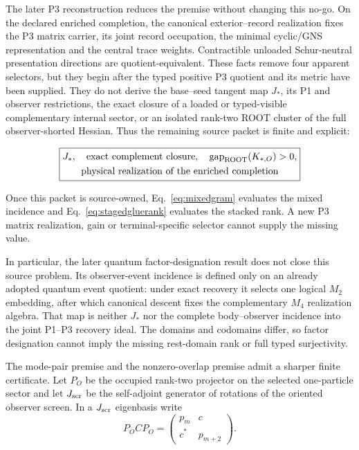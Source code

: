 \documentclass[11pt]{article}
\begin{document}
The later P3 reconstruction reduces the premise without changing this no-go.
On the declared enriched completion, the canonical exterior--record
realization fixes the P3 matrix carrier, its joint record occupation, the
minimal cyclic/GNS representation and the central trace weights. Contractible
unloaded Schur-neutral presentation directions are quotient-equivalent. These
facts remove four apparent selectors, but they begin after the typed positive
P3 quotient and its metric have been supplied. They do not derive the
base--seed tangent map $J_*$, its P1 and observer restrictions, the exact
closure of a loaded or typed-visible complementary internal sector, or an
isolated rank-two ROOT cluster of the full observer-shorted Hessian. Thus the
remaining source packet is finite and explicit:

\begin{equation}
\boxed{
\begin{gathered}
J_*,\quad \text{exact complement closure},\quad
\operatorname{gap}_{\rm ROOT}(K_{*,O})>0,\\
\text{physical realization of the enriched completion}
\end{gathered}}
\label{eq:p3premisereduction}
\end{equation}

Once this packet is source-owned, Eq.~\eqref{eq:mixedgram} evaluates the mixed
incidence and Eq.~\eqref{eq:stagedgluerank} evaluates the stacked rank. A new
P3 matrix realization, gain or terminal-specific selector cannot supply the
missing value.

In particular, the later quantum factor-designation result does not close
this source problem.  Its observer-event incidence is defined only on an
already adopted quantum event quotient: under exact recovery it selects one
logical $M_2$ embedding, after which canonical descent fixes the complementary
$M_4$ realization algebra.  That map is neither $J_*$ nor the complete
body--observer incidence into the joint P1--P3 recovery ideal.  The domains
and codomains differ, so factor designation cannot imply the missing
rest-domain rank or full typed surjectivity.

The mode-pair premise and the nonzero-overlap premise admit a sharper finite
certificate.  Let $P_O$ be the occupied rank-two projector on the selected
one-particle sector and let $J_{\rm scr}$ be the self-adjoint generator of
rotations of the oriented observer screen.  In a $J_{\rm scr}$ eigenbasis
write
\begin{equation}
P_O C P_O=
\begin{pmatrix}p_m&c\\c^*&p_{m+2}\end{pmatrix}.
\label{eq:rootttcluster}
\end{equation}
\end{document}
